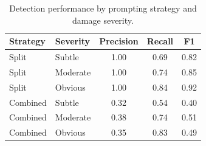 \begin{table}[h]
\centering
\begin{tabular}{llccc}
\toprule
Strategy & Severity & Precision & Recall & F1 \\
\midrule
Split & Subtle & 1.00 & 0.69 & 0.82 \\
Split & Moderate & 1.00 & 0.74 & 0.85 \\
Split & Obvious & 1.00 & 0.84 & 0.92 \\
\midrule
Combined & Subtle & 0.32 & 0.54 & 0.40 \\
Combined & Moderate & 0.38 & 0.74 & 0.51 \\
Combined & Obvious & 0.35 & 0.83 & 0.49 \\
\bottomrule
\end{tabular}
\caption{Detection performance by prompting strategy and damage severity.}
\label{tab:strategy-severity}
\end{table}